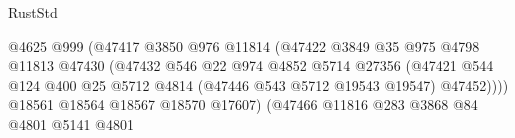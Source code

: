 \begin{lexlean}{RustStd}
\begin{coremodule}
                                                    @4625
                                                    @999
                                                    (@47417
                                                      @3850
                                                      @976
                                                      @11814
                                                      (@47422
                                                        @3849
                                                        @35
                                                        @975
                                                        @4798
                                                        @11813
                                                        @47430
                                                        (@47432
                                                          @546
                                                          @22
                                                          @974
                                                          @4852
                                                          @5714
                                                          @27356
                                                          (@47421
                                                            @544
                                                            @124
                                                            @400
                                                            @25
                                                            @5712
                                                            @4814
                                                            (@47446 @543 @5712 @19543 @19547)
                                                            @47452))))
                                                    @18561
                                                    @18564
                                                    @18567
                                                    @18570
                                                    @17607)
                                                  (@47466
                                                    @11816
                                                    @283
                                                    @3868
                                                    @84
                                                    @4801
                                                    @5141
                                                    @4801

\end{coremodule}
\end{lexlean}
